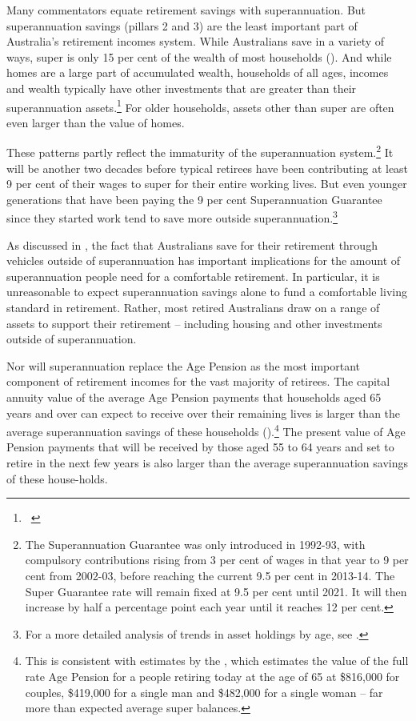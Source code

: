 Many commentators equate retirement savings with superannuation. But superannuation savings (pillars 2 and 3) are the least important part of Australia’s retirement incomes system. While Australians save in a variety of ways, super is only 15 per cent of the wealth of most households (). And while homes are a large part of accumulated wealth, households of all ages, incomes and wealth typically have other investments that are greater than their superannuation assets.\footnote{\gao\ \textcites{ABS2015HouseholdIncomeWealth1314}{ABS2013t}}  For older households, assets other than super are often even larger than the value of homes.

These patterns partly reflect the immaturity of the superannuation system.\footnote{%
The Superannuation Guarantee was only introduced in 1992-93, with compulsory contributions rising from 3 per cent of wages in that year to 9 per cent from 2002-03, before reaching the current 9.5 per cent in 2013-14. The Super Guarantee rate will remain fixed at 9.5 per cent until 2021. It will then increase by half a percentage point each year until it reaches 12 per cent. 
} It will be another two decades before typical retirees have been contributing at least 9 per cent of their wages to super for their entire working lives. But even younger generations that have been paying the 9 per cent Superannuation Guarantee since they started work tend to save more outside superannuation.\footnote{For a more detailed analysis of trends in asset holdings by age, see \textcite[][14]{DaleyWoodWeidmannEtAl2014}.}  


As discussed in , the fact that Australians save for their retirement through vehicles outside of superannuation has important implications for the amount of superannuation people need for a comfortable retirement. In particular, it is unreasonable to expect superannuation savings alone to fund a comfortable living standard in retirement. Rather, most retired Australians draw on a range of assets to support their retirement – including housing and other investments outside of superannuation. 

Nor will superannuation replace the Age Pension as the most important component of retirement incomes for the vast majority of retirees. The capital annuity value of the average Age Pension payments that households aged 65 years and over can expect to receive over their remaining lives is larger than the average superannuation savings of these households ().\footnote{This is consistent with estimates by the \textcite[][7]{ActuariesInstitute2015RetirementIncomes}, which estimates the value of the full rate Age Pension for a people retiring today at the age of 65 at \$816,000 for couples, \$419,000 for a single man and \$482,000 for a single woman – far more than expected average super balances.} The present value of Age Pension payments that will be received by those aged 55 to 64 years and set to retire in the next few years is also larger than the average superannuation savings of these house-holds. 


